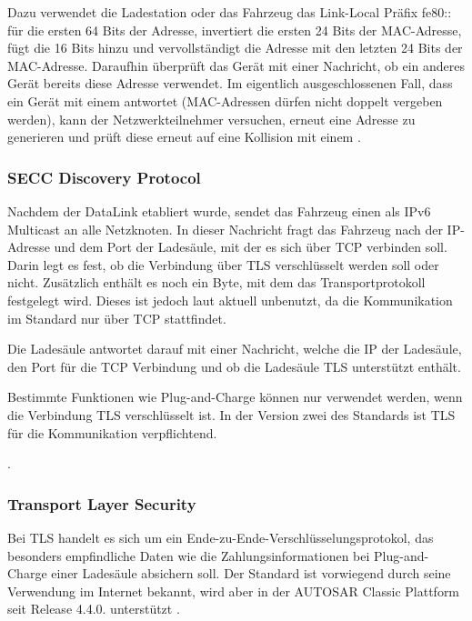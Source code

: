 Dazu verwendet die Ladestation oder das Fahrzeug das Link-Local Präfix fe80:: für die ersten 64 Bits der Adresse, invertiert die ersten 24 Bits der MAC-Adresse, fügt die 16 Bits  hinzu und vervollständigt die Adresse mit den letzten 24 Bits der MAC-Adresse. Daraufhin überprüft das Gerät mit einer  Nachricht, ob ein anderes Gerät bereits diese Adresse verwendet.
Im eigentlich ausgeschlossenen Fall, dass ein Gerät mit einem  antwortet (MAC-Adressen dürfen nicht doppelt vergeben werden), kann der Netzwerkteilnehmer versuchen, erneut eine Adresse zu generieren und prüft diese erneut auf eine Kollision mit einem  \cite[S. 505]{ipnetze}.


\subsubsection{SECC Discovery Protocol}\label{subsec:secc}

Nachdem der DataLink etabliert wurde, sendet das Fahrzeug einen  als IPv6 Multicast an alle Netzknoten. In dieser Nachricht fragt das Fahrzeug nach der IP-Adresse und dem Port der Ladesäule, mit der es sich über TCP verbinden soll. Darin legt es fest, ob die Verbindung über TLS verschlüsselt werden soll oder nicht. Zusätzlich enthält es noch ein Byte, mit dem das Transportprotokoll festgelegt wird. Dieses ist jedoch laut \cite[]{masterIso15118} aktuell unbenutzt, da die Kommunikation im Standard nur über TCP stattfindet. 

Die Ladesäule antwortet darauf mit einer  Nachricht, welche die IP der Ladesäule, den Port für die TCP Verbindung und ob die Ladesäule TLS unterstützt enthält.

Bestimmte Funktionen wie Plug-and-Charge können nur verwendet werden, wenn die Verbindung TLS verschlüsselt ist. In der Version zwei des Standards ist TLS für die Kommunikation verpflichtend. 

\cite[S. 123]{masterIso15118}.

\subsubsection{Transport Layer Security}\label{subsec:tls}

Bei TLS handelt es sich um ein Ende-zu-Ende-Verschlüsselungsprotokol, das besonders empfindliche Daten wie die Zahlungsinformationen bei Plug-and-Charge einer Ladesäule absichern soll. Der Standard ist vorwiegend durch seine Verwendung im Internet bekannt, wird aber in der AUTOSAR Classic Plattform seit Release 4.4.0. unterstützt \cite[Kapitel 5.2]{automotiveprotocolssecurity}.

